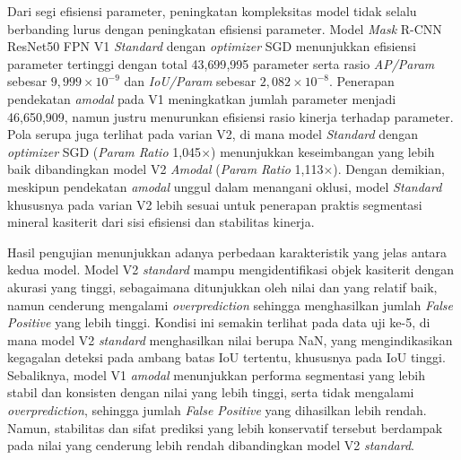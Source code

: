 Dari segi efisiensi parameter, peningkatan kompleksitas model tidak selalu berbanding lurus dengan peningkatan efisiensi parameter. Model \textit{Mask} R-CNN ResNet50 FPN V1 \textit{Standard} dengan \textit{optimizer} SGD menunjukkan efisiensi parameter tertinggi dengan total 43{,}699{,}995 parameter serta rasio \textit{AP/Param} sebesar $9{,}999\times10^{-9}$ dan \textit{IoU/Param} sebesar $2{,}082\times10^{-8}$. Penerapan pendekatan \textit{amodal} pada V1 meningkatkan jumlah parameter menjadi 46{,}650{,}909, namun justru menurunkan efisiensi rasio kinerja terhadap parameter. Pola serupa juga terlihat pada varian V2, di mana model \textit{Standard} dengan \textit{optimizer} SGD (\textit{Param Ratio} 1{,}045$\times$) menunjukkan keseimbangan yang lebih baik dibandingkan model V2 \textit{Amodal} (\textit{Param Ratio} 1{,}113$\times$). Dengan demikian, meskipun pendekatan \textit{amodal} unggul dalam menangani oklusi, model \textit{Standard} khususnya pada varian V2 lebih sesuai untuk penerapan praktis segmentasi mineral kasiterit dari sisi efisiensi dan stabilitas kinerja. \par

Hasil pengujian menunjukkan adanya perbedaan karakteristik yang jelas antara kedua model. Model V2 \textit{standard} mampu mengidentifikasi objek kasiterit dengan akurasi yang tinggi, sebagaimana ditunjukkan oleh nilai \APrangefiftyy dan \IoUrangefiftyy yang relatif baik, namun cenderung mengalami \textit{overprediction} sehingga menghasilkan jumlah \textit{False Positive} yang lebih tinggi. Kondisi ini semakin terlihat pada data uji ke-5, di mana model V2 \textit{standard} menghasilkan nilai \IoUrangefiftyy berupa NaN, yang mengindikasikan kegagalan deteksi pada ambang batas IoU tertentu, khususnya pada IoU tinggi. Sebaliknya, model V1 \textit{amodal} menunjukkan performa segmentasi yang lebih stabil dan konsisten dengan nilai \IoUrangefiftyy yang lebih tinggi, serta tidak mengalami \textit{overprediction}, sehingga jumlah \textit{False Positive} yang dihasilkan lebih rendah. Namun, stabilitas dan sifat prediksi yang lebih konservatif tersebut berdampak pada nilai \APrangefiftyy yang cenderung lebih rendah dibandingkan model V2 \textit{standard}. \par

